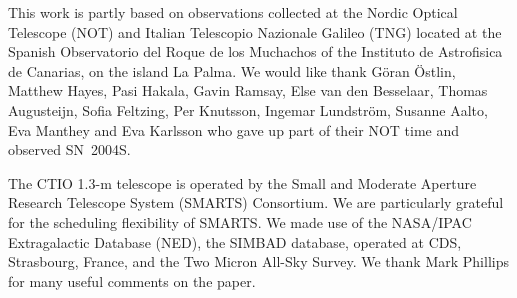 \documentclass[12pt,preprint,psfig,epsf]{aastex}
\begin{document}
\vspace {1 cm}

\acknowledgments

This work is partly based on observations collected at the Nordic
Optical Telescope (NOT) and Italian Telescopio Nazionale Galileo (TNG)
located at the Spanish Observatorio del Roque de los Muchachos of
the Instituto de Astrofisica de Canarias, on the island La Palma.
We would like thank G\"{o}ran \"{O}stlin, Matthew Hayes, Pasi Hakala, Gavin
Ramsay, Else van den Besselaar, Thomas Augusteijn, Sofia Feltzing, Per
Knutsson,  Ingemar Lundstr\"{o}m, Susanne Aalto, Eva Manthey and Eva
Karlsson who gave up part of their NOT time and observed SN~2004S.

The CTIO 1.3-m telescope is operated by the Small
and Moderate Aperture Research Telescope System (SMARTS) Consortium.
We are particularly grateful for the scheduling flexibility of SMARTS.
We made use of the NASA/IPAC Extragalactic Database (NED), the SIMBAD 
database, operated at CDS, Strasbourg, France, and the Two Micron
All-Sky Survey.  We thank Mark Phillips for many useful comments on the paper.
\end{document}

